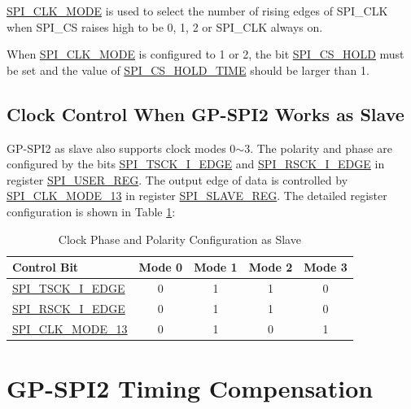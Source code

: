 \documentclass[main\_\_EN.tex]{subfiles}
\begin{document}
\hyperref[fielddesc:SPICLKMODE]{SPI\_CLK\_MODE} is used to select the number of rising edges of SPI\_CLK when SPI\_CS raises high to be 0, 1, 2 or SPI\_CLK always on.

\begin{tiplisting}
 When \hyperref[fielddesc:SPICLKMODE]{SPI\_CLK\_MODE} is configured to 1 or 2, the bit \hyperref[fielddesc:SPICSHOLD]{SPI\_CS\_HOLD} must be set and the value of \hyperref[fielddesc:SPICSHOLDTIME]{SPI\_CS\_HOLD\_TIME} should be larger than 1.
\end{tiplisting}
\vspace{-1em}

\subsection{Clock Control When GP-SPI2 Works as Slave}\label{GP-SPI slave clock control}

GP-SPI2 as slave also supports clock modes 0$\sim$3. The polarity and phase are configured by the bits \hyperref[fielddesc:SPITSCKIEDGE]{SPI\_TSCK\_I\_EDGE} and \hyperref[fielddesc:SPIRSCKIEDGE]{SPI\_RSCK\_I\_EDGE} in register \hyperref[regdesc:SPIUSERREG]{SPI\_USER\_REG}. The output edge of data is controlled by \hyperref[fielddesc:SPICLKMODE13]{SPI\_CLK\_MODE\_13} in register \hyperref[regdesc:SPISLAVEREG]{SPI\_SLAVE\_REG}. The detailed register configuration is shown in Table \ref{table:clock_pol_slave}:

\begin{table}[H]
    \centering
    \caption{Clock Phase and Polarity Configuration as Slave}
    \label{table:clock_pol_slave}
    \begin{tabular}[c]{|p{3.5cm}|c|c|c|c|}
    \hline
    \rowcolor{lightgray}
    \textbf{Control Bit} & \textbf{Mode 0} & \textbf{Mode 1} & \textbf{Mode 2} & \textbf{Mode 3}\\
    \hline
   \hyperref[fielddesc:SPITSCKIEDGE]{SPI\_TSCK\_I\_EDGE}   & 0 & 1 & 1 & 0\\
    \hline
   \hyperref[fielddesc:SPIRSCKIEDGE]{SPI\_RSCK\_I\_EDGE}   & 0 & 1 & 1 & 0\\
    \hline
   \hyperref[fielddesc:SPICLKMODE13]{SPI\_CLK\_MODE\_13}     & 0 & 1 & 0 & 1\\
    \hline
    \end{tabular}
\end{table}


\section{GP-SPI2 Timing Compensation} \label{sec:gp-spi-timing-compensation}
\end{document}
